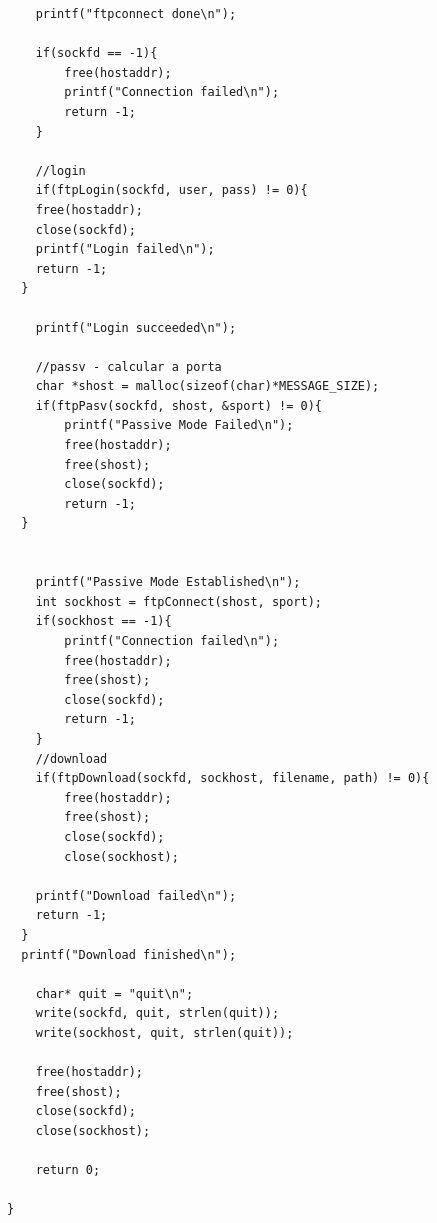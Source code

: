 \documentclass[a4paper]{article}
\begin{document}
\begin{verbatim}
	printf("ftpconnect done\n");

	if(sockfd == -1){
		free(hostaddr);
		printf("Connection failed\n");
		return -1;
	}

	//login
	if(ftpLogin(sockfd, user, pass) != 0){
	free(hostaddr);
	close(sockfd);
    printf("Login failed\n");
    return -1;
  }

	printf("Login succeeded\n");

	//passv - calcular a porta
	char *shost = malloc(sizeof(char)*MESSAGE_SIZE);
	if(ftpPasv(sockfd, shost, &sport) != 0){
		printf("Passive Mode Failed\n");
		free(hostaddr);
		free(shost);
		close(sockfd);
		return -1;
  }


	printf("Passive Mode Established\n");
	int sockhost = ftpConnect(shost, sport);
	if(sockhost == -1){
		printf("Connection failed\n");
		free(hostaddr);
		free(shost);
		close(sockfd);
		return -1;
	}
	//download
	if(ftpDownload(sockfd, sockhost, filename, path) != 0){
		free(hostaddr);
		free(shost);
		close(sockfd);
		close(sockhost);

    printf("Download failed\n");
    return -1;
  }
  printf("Download finished\n");

	char* quit = "quit\n";
	write(sockfd, quit, strlen(quit));
	write(sockhost, quit, strlen(quit));

	free(hostaddr);
	free(shost);
	close(sockfd);
	close(sockhost);

	return 0;

}
\end{verbatim}
\end{document}
